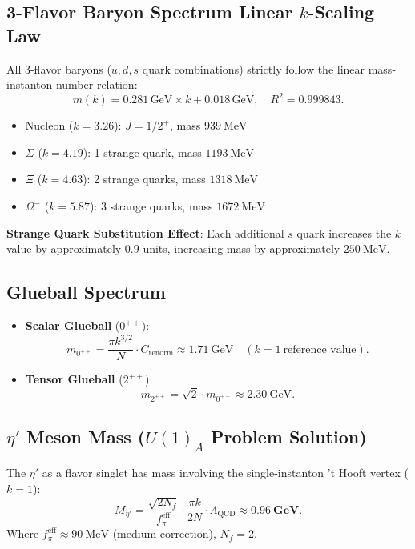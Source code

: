 \documentclass[12pt,a4paper]{amsart}
\theoremstyle{plain}
\theoremstyle{definition}
\theoremstyle{remark}
\DeclareMathOperator{\QCD}{QCD}
\begin{document}
\subsection{3-Flavor Baryon Spectrum Linear $k$-Scaling Law}

All 3-flavor baryons ($u,d,s$ quark combinations) strictly follow the linear mass-instanton number relation:
\begin{equation}
m(k) = 0.281\,\text{GeV} \times k + 0.018\,\text{GeV}, \quad R^2 = 0.999843.
\end{equation}
\begin{itemize}
\item Nucleon ($k=3.26$): $J=1/2^+$, mass $939\ \text{MeV}$
\item $\Sigma$ ($k=4.19$): 1 strange quark, mass $1193\ \text{MeV}$
\item $\Xi$ ($k=4.63$): 2 strange quarks, mass $1318\ \text{MeV}$
\item $\Omega^-$ ($k=5.87$): 3 strange quarks, mass $1672\ \text{MeV}$
\end{itemize}
\textbf{Strange Quark Substitution Effect}: Each additional $s$ quark increases the $k$ value by approximately $0.9$ units, increasing mass by approximately $250\ \text{MeV}$.

\subsection{Glueball Spectrum}

\begin{itemize}
\item \textbf{Scalar Glueball} ($0^{++}$):
\begin{equation}
m_{0^{++}} = \frac{\pi k^{3/2}}{N} \cdot C_{\text{renorm}} \approx 1.71\ \text{GeV} \quad (k=1\ \text{reference value}).
\end{equation}
\item \textbf{Tensor Glueball} ($2^{++}$):
\begin{equation}
m_{2^{++}} = \sqrt{2} \cdot m_{0^{++}} \approx 2.30\ \text{GeV}.
\end{equation}
\end{itemize}

\subsection{$\eta'$ Meson Mass ($U(1)_A$ Problem Solution)}

The $\eta'$ as a flavor singlet has mass involving the single-instanton 't Hooft vertex ($k=1$):
\begin{equation}
M_{\eta'} = \frac{\sqrt{2N_f}}{f_\pi^{\text{eff}}} \cdot \frac{\pi k}{2N} \cdot \Lambda_{\QCD} \approx \mathbf{0.96\ \text{GeV}}.
\end{equation}
Where $f_\pi^{\text{eff}} \approx 90\ \text{MeV}$ (medium correction), $N_f=2$.
\end{document}
